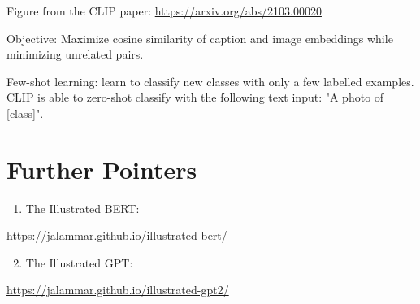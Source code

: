 \documentclass[10pt]{article}
\begin{document}
Figure from the CLIP paper: \href{https://arxiv.org/abs/2103.00020}{https://arxiv.org/abs/2103.00020}

Objective: Maximize cosine similarity of caption and image embeddings while minimizing unrelated pairs.

Few-shot learning: learn to classify new classes with only a few labelled examples. CLIP is able to zero-shot classify with the following text input: "A photo of [class]".

\section*{Further Pointers}
\begin{enumerate}
  \item The Illustrated BERT:
\end{enumerate}

\href{https://jalammar.github.io/illustrated-bert/}{https://jalammar.github.io/illustrated-bert/}

\begin{enumerate}
  \setcounter{enumi}{1}
  \item The Illustrated GPT:
\end{enumerate}

\href{https://jalammar.github.io/illustrated-gpt2/}{https://jalammar.github.io/illustrated-gpt2/}
\end{document}
